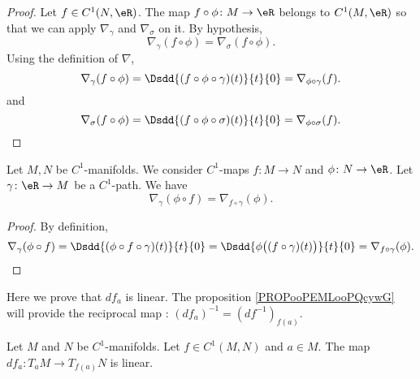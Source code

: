 \begin{proof}
    Let \( f\in C^1(N,\eR)\). The map \( f\circ\phi\colon M\to \eR\) belongs to \( C^1(M,\eR)\) so that we can apply \( \nabla_{\gamma}\) and \( \nabla_{\sigma}\) on it. By hypothesis,
    \begin{equation}
        \nabla_{\gamma}(f\circ \phi)=\nabla_{\sigma}(f\circ \phi).
    \end{equation}
    Using the definition of \( \nabla\),
    \begin{equation}
        \nabla_{\gamma}(f\circ\phi)=\Dsdd{ (f\circ \phi\circ \gamma)(t) }{t}{0}=\nabla_{\phi\circ\gamma}(f).
    \end{equation}
    and
    \begin{equation}
        \nabla_{\sigma}(f\circ\phi)=\Dsdd{ (f\circ \phi\circ \sigma)(t) }{t}{0}=\nabla_{\phi\circ\sigma}(f).
    \end{equation}
\end{proof}

\begin{lemma}        \label{LEMooBOZBooNJMccB}
    Let \( M,N\) be \( C^1\)-manifolds. We consider \( C^1\)-maps \( f\colon M\to N\) and \( \phi\colon N\to \eR\). Let \( \gamma\colon \eR\to M\) be a \( C^1\)-path. We have
    \begin{equation}
        \nabla_{\gamma}(\phi\circ f)=\nabla_{f\circ \gamma}(\phi).
    \end{equation}
\end{lemma}

\begin{proof}
    By definition,
    \begin{equation}
        \nabla_{\gamma}(\phi\circ f)=\Dsdd{ (\phi\circ f\circ \gamma)(t) }{t}{0}=\Dsdd{ \phi\big( (f\circ \gamma)(t) \big) }{t}{0}=\nabla_{f\circ\gamma}(\phi).
    \end{equation}
\end{proof}

Here we prove that \( df_a\) is linear. The proposition \ref{PROPooPEMLooPQcywG} will provide the reciprocal map : \( (df_a)^{-1}=(df^{-1})_{f(a)}\).
\begin{proposition}     \label{PROPooNRLVooChhiIS}
    Let \( M\) and \( N\) be \( C^1\)-manifolds. Let \( f\in C^1(M,N)\) and \( a\in M\). The map \( df_a\colon T_aM\to T_{f(a)}N\) is linear.
\end{proposition}

